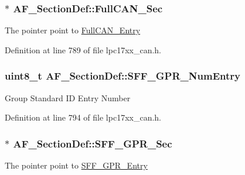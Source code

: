 \hypertarget{struct_a_f___section_def_a3d93835ce208050b74148dbcbdec7858}{
\subsubsection[{\-Full\-C\-A\-N\-\_\-\-Sec}]{$\ast$ {\bf \-A\-F\-\_\-\-Section\-Def\-::\-Full\-C\-A\-N\-\_\-\-Sec}}}\label{struct_a_f___section_def_a3d93835ce208050b74148dbcbdec7858}
\-The pointer point to \hyperlink{struct_full_c_a_n___entry}{\-Full\-C\-A\-N\-\_\-\-Entry} 

\-Definition at line 789 of file lpc17xx\-\_\-can.\-h.

\hypertarget{struct_a_f___section_def_a5256e7d8484c27ce828332c303519f4e}{
\subsubsection[{\-S\-F\-F\-\_\-\-G\-P\-R\-\_\-\-Num\-Entry}]{\setlength{\rightskip}{0pt plus 5cm}uint8\-\_\-t {\bf \-A\-F\-\_\-\-Section\-Def\-::\-S\-F\-F\-\_\-\-G\-P\-R\-\_\-\-Num\-Entry}}}\label{struct_a_f___section_def_a5256e7d8484c27ce828332c303519f4e}
\-Group \-Standard \-I\-D \-Entry \-Number 

\-Definition at line 794 of file lpc17xx\-\_\-can.\-h.

\hypertarget{struct_a_f___section_def_a1f961d228820b292a137a3988e8d1419}{
\subsubsection[{\-S\-F\-F\-\_\-\-G\-P\-R\-\_\-\-Sec}]{$\ast$ {\bf \-A\-F\-\_\-\-Section\-Def\-::\-S\-F\-F\-\_\-\-G\-P\-R\-\_\-\-Sec}}}\label{struct_a_f___section_def_a1f961d228820b292a137a3988e8d1419}
\-The pointer point to \hyperlink{struct_s_f_f___g_p_r___entry}{\-S\-F\-F\-\_\-\-G\-P\-R\-\_\-\-Entry} 

